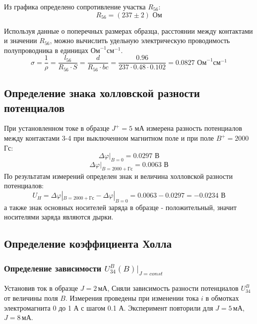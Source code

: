 Из графика определено сопротивление участка $R_{56}$:
\begin{equation}
	R_{56}=(237\pm 2) \text{ Ом}
\end{equation}

Используя данные о поперечных размерах образца, расстоянии между контактами и значении $R_{56}$, можно вычислить удельную электрическую проводимость полупроводника в единицах $\text{Ом}^{-1}\text{см}^{-1}$.
\begin{equation}
	\sigma=\frac{1}{\rho} =\frac{l_{56}}{R_{56} \cdot S}=\frac{d}{R_{56}\cdot bc}=\frac{0.96}{237\cdot 0.48\cdot 0.102}=0.0827 \text{ Ом}^{-1}\text{см}^{-1}
\end{equation}

\subsection{Определение знака холловской разности потенциалов}

При установленном токе в образце $J^{+}=5$ мА измерена разность потенциалов между
контактами 3-4 при выключенном магнитном поле и при поле $B^{+}=2000$ Гс:
\begin{equation}
	\Delta\varphi|_{B=0}=0.0297 \text{ В}
\end{equation}
\begin{equation}
	\Delta\varphi|_{B=2000+ \text{Гс}}=0.0063 \text{ В}
\end{equation}
По результатам измерений определен знак и величина холловской разности потенциалов:
\begin{equation}
	U_H=\Delta\varphi|_{B=2000+ \text{Гс}}-\Delta\varphi|_{B=0}=0.0063-0.0297=-0.0234 \text{ В}
\end{equation}
а также знак основных носителей заряда в образце - положительный, значит носителями заряда являются дырки.

\subsection{Определение коэффициента Холла}
\subsubsection{Определение зависимости $U^B_{34}(B)|_{J=const}$}
Установив ток в образце ${J=2\,\text{мА}}$, Сняли зависимость разности потенциалов $U^B_{34}$ от величины поля $B$. Измерения проведены  при изменении тока $i$ в обмотках электромагнита 0 до 1 А с шагом 0.1 А. Эксперимент повторили для ${J=5\,\text{мА}}$, ${J=8\,\text{мА}}$.


